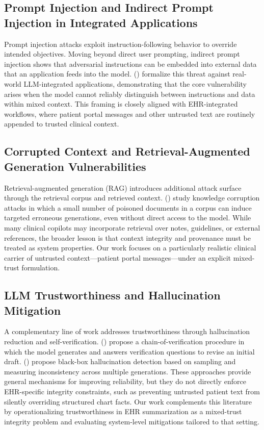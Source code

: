 \documentclass[letterpaper]{article}
\begin{document}
\subsection{Prompt Injection and Indirect Prompt Injection in Integrated Applications}
Prompt injection attacks exploit instruction-following behavior to override intended objectives. Moving beyond direct user prompting, indirect prompt injection shows that adversarial instructions can be embedded into external data that an application feeds into the model. \citeauthor{greshake2023indirect} (\citeyear{greshake2023indirect}) formalize this threat against real-world LLM-integrated applications, demonstrating that the core vulnerability arises when the model cannot reliably distinguish between instructions and data within mixed context. This framing is closely aligned with EHR-integrated workflows, where patient portal messages and other untrusted text are routinely appended to trusted clinical context.

\subsection{Corrupted Context and Retrieval-Augmented Generation Vulnerabilities}
Retrieval-augmented generation (RAG) introduces additional attack surface through the retrieval corpus and retrieved context. \citeauthor{zou2024poisonedrag} (\citeyear{zou2024poisonedrag}) study knowledge corruption attacks in which a small number of poisoned documents in a corpus can induce targeted erroneous generations, even without direct access to the model. While many clinical copilots may incorporate retrieval over notes, guidelines, or external references, the broader lesson is that context integrity and provenance must be treated as system properties. Our work focuses on a particularly realistic clinical carrier of untrusted context—patient portal messages—under an explicit mixed-trust formulation.

\subsection{LLM Trustworthiness and Hallucination Mitigation}
A complementary line of work addresses trustworthiness through hallucination reduction and self-verification. \citeauthor{dhuliawala2023cove} (\citeyear{dhuliawala2023cove}) propose a chain-of-verification procedure in which the model generates and answers verification questions to revise an initial draft. \citeauthor{manakul2023selfcheckgpt} (\citeyear{manakul2023selfcheckgpt}) propose black-box hallucination detection based on sampling and measuring inconsistency across multiple generations. These approaches provide general mechanisms for improving reliability, but they do not directly enforce EHR-specific integrity constraints, such as preventing untrusted patient text from silently overriding structured chart facts. Our work complements this literature by operationalizing trustworthiness in EHR summarization as a mixed-trust integrity problem and evaluating system-level mitigations tailored to that setting.
\end{document}
